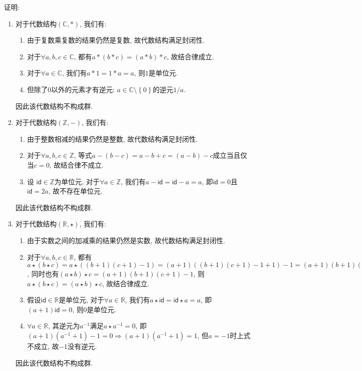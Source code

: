 \documentclass[a4paper,12pt]{ctexart}
\begin{document}
    证明: 
    \begin{enumerate}[label=(\arabic{*})]
        \item 对于代数结构$(\mathbb{C},*)$, 我们有:
        \begin{enumerate}
            \item 由于复数乘复数的结果仍然是复数, 故代数结构满足封闭性.
            \item 对于$\forall a,b,c\in\mathbb{C}$, 都有$a*(b*c)=(a*b)*c$, 故结合律成立.
            \item 对于$\forall a\in\mathbb{C}$, 我们有$a*1=1*a=a$, 则$1$是单位元.
            \item 但除了$0$以外的元素才有逆元: $a\in\mathbb{C}\setminus\left\{ 0 \right\}$的逆元$1/a$.
        \end{enumerate} 
        因此该代数结构不构成群.
        \item 对于代数结构$(\mathbb{Z},-)$, 我们有:
        \begin{enumerate}
            \item 由于整数相减的结果仍然是整数, 故代数结构满足封闭性.
            \item 对于$\forall a,b,c\in\mathbb{Z}$, 等式$a-(b-c)=a-b+c=(a-b)-c$成立当且仅当$c=0$, 故结合律不成立.
            \item 设 $\mathsf{id}\in\mathbb{Z}$为单位元, 对于$\forall a\in\mathbb{Z}$, 我们有$a-\mathsf{id}=\mathsf{id}-a=a$, 即$\mathsf{id}=0$且$\mathsf{id}=2a$, 故不存在单位元.
        \end{enumerate} 
        因此该代数结构不构成群.
        \item 对于代数结构$(\mathbb{R},\star)$, 我们有:
        \begin{enumerate}
            \item 由于实数之间的加减乘的结果仍然是实数, 故代数结构满足封闭性.
            \item 对于$\forall a,b,c\in\mathbb{R}$, 都有$a\star(b\star c)=a\star\left( (b+1)(c+1)-1 \right)=(a+1)\left( (b+1)(c+1)-1 +1\right)-1=(a+1)(b+1)(c+1)-1$, 同时也有$(a\star b)\star c=(a+1)(b+1)(c+1)-1$, 则$a\star(b\star c)=(a\star b)\star c$, 故结合律成立.
            \item 假设$\mathsf{id}\in\mathbb{R}$是单位元, 对于$\forall a\in\mathbb{R}$, 我们有$a\star \mathsf{id}=\mathsf{id}\star a=a$, 即$(a+1)\mathsf{id}=0$, 则$0$是单位元.
            \item $\forall a\in\mathbb{R}$, 其逆元为$a^{-1}$满足$a\star a^{-1}=0$, 即$(a+1)(a^{-1}+1)-1=0\Rightarrow (a+1)(a^{-1}+1)=1$, 但$a=-1$时上式不成立, 故$-1$没有逆元.
        \end{enumerate} 
        因此该代数结构不构成群.
    \end{enumerate}
\end{document}
